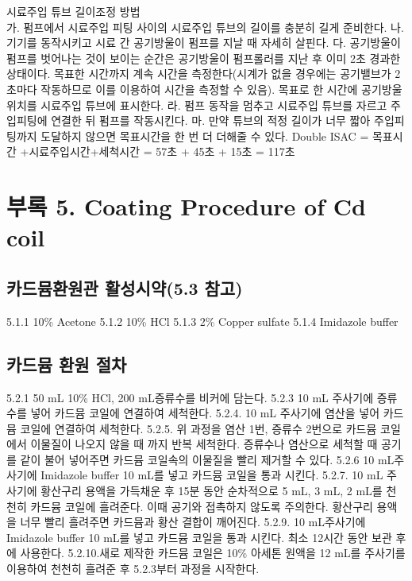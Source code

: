 \documentclass[
]{book}
\begin{document}
시료주입 튜브 길이조정 방법\\
가. 펌프에서 시료주입 피팅 사이의 시료주입 튜브의 길이를 충분히 길게 준비한다.
나. 기기를 동작시키고 시료 간 공기방울이 펌프를 지날 때 자세히 살핀다.
다. 공기방울이 펌프를 벗어나는 것이 보이는 순간은 공기방울이 펌프롤러를 지난 후 이미 2초 경과한 상태이다. 목표한 시간까지 계속 시간을 측정한다(시계가 없을 경우에는 공기밸브가 2초마다 작동하므로 이를 이용하여 시간을 측정할 수 있음). 목표로 한 시간에 공기방울 위치를 시료주입 튜브에 표시한다.
라. 펌프 동작을 멈추고 시료주입 튜브를 자르고 주입피팅에 연결한 뒤 펌프를 작동시킨다.
마. 만약 튜브의 적정 길이가 너무 짧아 주입피팅까지 도달하지 않으면 목표시간을 한 번 더 더해줄 수 있다.
Double ISAC = 목표시간 +시료주입시간+세척시간
= 57초 + 45초 + 15초 = 117초

\hypertarget{uxbd80uxb85d-5.-coating-procedure-of-cd-coil}{%
\section{부록 5. Coating Procedure of Cd coil}\label{uxbd80uxb85d-5.-coating-procedure-of-cd-coil}}

\hypertarget{uxce74uxb4dcuxbbb4uxd658uxc6d0uxad00-uxd65cuxc131uxc2dcuxc57d5.3-uxcc38uxace0}{%
\subsection{카드뮴환원관 활성시약(5.3 참고)}\label{uxce74uxb4dcuxbbb4uxd658uxc6d0uxad00-uxd65cuxc131uxc2dcuxc57d5.3-uxcc38uxace0}}

5.1.1 10\% Acetone
5.1.2 10\% HCl
5.1.3 2\% Copper sulfate
5.1.4 Imidazole buffer

\hypertarget{uxce74uxb4dcuxbbb4-uxd658uxc6d0-uxc808uxcc28}{%
\subsection{카드뮴 환원 절차}\label{uxce74uxb4dcuxbbb4-uxd658uxc6d0-uxc808uxcc28}}

5.2.1 50 mL 10\% HCl, 200 mL증류수를 비커에 담는다.
5.2.3 10 mL 주사기에 증류수를 넣어 카드뮴 코일에 연결하여 세척한다.
5.2.4. 10 mL 주사기에 염산을 넣어 카드뮴 코일에 연결하여 세척한다.
5.2.5. 위 과정을 염산 1번, 증류수 2번으로 카드뮴 코일에서 이물질이 나오지 않을 때 까지 반복 세척한다. 증류수나 염산으로 세척할 때 공기를 같이 불어 넣어주면 카드뮴 코일속의 이물질을 빨리 제거할 수 있다.
5.2.6 10 mL주사기에 Imidazole buffer 10 mL를 넣고 카드뮴 코일을 통과 시킨다.
5.2.7. 10 mL 주사기에 황산구리 용액을 가득채운 후 15분 동안 순차적으로 5 mL, 3 mL, 2 mL를 천천히 카드뮴 코일에 흘려준다. 이때 공기와 접촉하지 않도록 주의한다. 황산구리 용액을 너무 빨리 흘려주면 카드뮴과 황산 결합이 깨어진다.
5.2.9. 10 mL주사기에 Imidazole buffer 10 mL를 넣고 카드뮴 코일을 통과 시킨다. 최소 12시간 동안 보관 후에 사용한다.
5.2.10.새로 제작한 카드뮴 코일은 10\% 아세톤 원액을 12 mL를 주사기를 이용하여 천천히 흘려준 후 5.2.3부터 과정을 시작한다.
\end{document}
